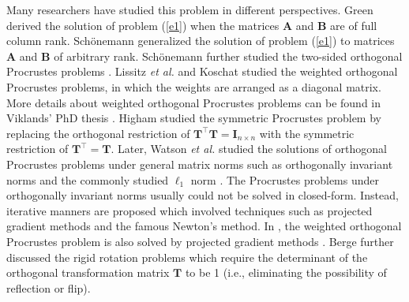 \documentclass[titlepage,11pt,twoside]{article}
\begin{document}
Many researchers have studied this problem in different perspectives. Green \cite{green1952orthogonal} derived the solution of problem (\ref{e1}) when the matrices $\mathbf{A}$ and $\mathbf{B}$ are of full column rank. Sch{\"o}nemann \cite{schonemann1966generalized} generalized the solution of problem (\ref{e1}) to matrices $\mathbf{A}$ and $\mathbf{B}$ of arbitrary rank. Sch{\"o}nemann further studied the two-sided orthogonal Procrustes problems \cite{schonemann1968two}. Lissitz \emph{et al.} \cite{Lissitz1976} and Koschat \cite{Koschat1991} studied the weighted orthogonal Procrustes problems, in which the weights are arranged as a diagonal matrix. More details about weighted orthogonal Procrustes problems can be found in Viklands' PhD thesis \cite{viklands2006algorithms}. Higham \cite{higham1988symmetric} studied the symmetric Procrustes problem by replacing the orthogonal restriction of $\mathbf{T}^{\top}\mathbf{T}=\mathbf{I}_{n\times n}$ with the symmetric restriction of $\mathbf{T}^{\top}=\mathbf{T}$. Later, Watson \emph{et al.} studied the solutions of orthogonal Procrustes problems under general matrix norms such as orthogonally invariant norms \cite{Watson1994} and the commonly studied $\ell_{1}$ norm \cite{trendafilov2004l1}. The Procrustes problems under orthogonally invariant norms usually could not be solved in closed-form. Instead, iterative manners are proposed which involved techniques such as projected gradient methods \cite{chu1990projected} and the famous Newton's method. In \cite{trendafilov2004l1}, the weighted orthogonal Procrustes problem is also solved by projected gradient methods \cite{chu1990projected}. Berge \cite{Berge2006} further discussed the rigid rotation problems which require the determinant of the orthogonal transformation matrix $\mathbf{T}$ to be 1 (i.e., eliminating the possibility of reflection or flip).
\end{document}
